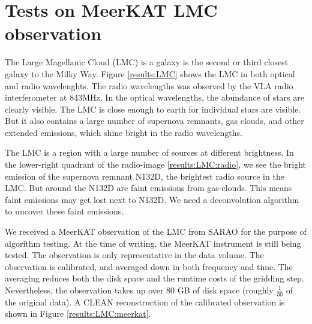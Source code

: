 \section{Tests on MeerKAT LMC observation}\label{results}
The Large Magellanic Cloud (LMC) is a galaxy is the second or third closest galaxy to the Milky Way. Figure \ref{results:LMC} shows the LMC in both optical and radio wavelenghts. The radio wavelengths was observed by the VLA radio interferometer\cite{bock1999sumss} at 843MHz. In the optical wavelengths, the abundance of stars are clearly visible. The LMC is close enough to earth for individual stars are visible. But it also contains a large number of supernova remnants, gas clouds, and other extended emissions, which shine bright in the radio wavelengths.
 
The LMC is a region with a large number of sources at different brightness. In the lower-right quadrant of the radio-image \ref{results:LMC:radio}, we see the bright emission of the supernova remnant N132D, the brightest radio source in the LMC. But around the N132D are faint emissions from gas-clouds. This means faint emissions may get lost next to N132D. We need a deconvolution algorithm to uncover these faint emissions.
 
We received a MeerKAT observation of the LMC from SARAO for the purpose of algorithm testing. At the time of writing, the MeerKAT instrument is still being tested. The observation is only representative in the data volume. The observation is calibrated, and averaged down in both frequency and time. The averaging reduces both the disk space and the runtime costs of the gridding step. Nevertheless, the observation takes up over 80 GB of disk space (roughly $\frac{1}{30}$ of the original data). A CLEAN reconstruction of the calibrated observation is shown in Figure \ref{results:LMC:meerkat}.
 
